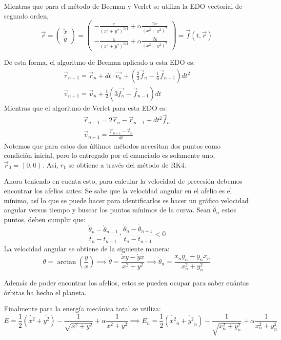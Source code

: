 \documentclass[letterpaper,oneside]{article}
\begin{document}
Mientras que para el método de Beeman y Verlet se utiliza la EDO vectorial de segundo orden,
$$\ddot\vec{r}=\begin{pmatrix}
\ddot{x}\\ 
\ddot{y}
\end{pmatrix}
=
\begin{pmatrix}
-\frac{x}{(x^2+y^2)^{3/2}}+\alpha\frac{2x}{(x^2+y^2)^2}\\ 
-\frac{y}{(x^2+y^2)^{3/2}}+\alpha\frac{2y}{(x^2+y^2)^2} 

\end{pmatrix}
=\vec{f}(t,\vec{r})      $$

De esta forma, el algoritmo de Beeman aplicado a esta EDO es:
$$\begin{matrix}
\vec{r}_{n+1}=\vec{r}_n+dt\cdot\vec{v_n}+(\frac{2}{3}\vec{f}_n-\frac{1}{6}\vec{f}_{n-1})dt^2\\ 
\vec{v}_{n+1}=\vec{v}_n+\frac{1}{2}(3\vec{f_n}-\vec{f}_{n-1})dt
\end{matrix} $$
Mientras que el algoritmo de Verlet para esta EDO es:
$$ 
\begin{matrix}
\vec{r}_{n+1}=2\vec{r}_n-\vec{r}_{n-1}+dt^2\vec{f}_n\\ 
\vec{v}_{n+1}=\frac{\vec{r}_{n+1}-\vec{r}_n}{dt}
\end{matrix}$$
Notemos que para estos dos últimos métodos necesitan dos puntos como condición inicial, pero lo entregado por el enunciado es solamente 
uno, $\vec{r}_0=(0,0)$. Así, $r_{1}$ se obtiene a través del método de RK4.

Ahora teniendo en cuenta esto, para calcular la velocidad de precesión debemos encontrar los afelios antes. Se sabe que la velocidad angular en el afelio es el mínimo, así lo que se puede hacer para identificarlos es hacer un gráfico velocidad angular versus tiempo y buscar los puntos mínimos de la curva. Sean $\dot{\theta}_n$ estos puntos, deben cumplir que:
$$ \frac{\dot{\theta}_n-\dot{\theta}_{n-1}}{t_n-t_{n-1}}\cdot \frac{\dot{\theta}_n-\dot{\theta}_{n+1}}{t_n-t_{n+1}} < 0$$
La velocidad angular se obtiene de la siguiente manera:
$$\theta=\arctan(\frac{y}{x})\implies \dot\theta=\frac{\dot{x}y-\dot{y}x}{x^2+y^2}\implies \dot\theta_n=\frac{\dot{x}_n y_n-\dot{y}_n x_n}{x_n^2+y_n^2}$$

Además de poder encontrar los afelios, estos se pueden ocupar para saber cuántas órbitas ha hecho el planeta.


Finalmente para la energía mecánica total se utiliza:
$$E= \frac{1}{2}(\dot{x^2}+\dot{y^2})-\frac{1}{\sqrt{x^2+y^2}}+\alpha \frac{1}{x^2+y^2}  \implies E_n =  \frac{1}{2}(\dot{x^2}_n+\dot{y^2}_n)-\frac{1}{\sqrt{x_n^2+y_n^2}}+\alpha \frac{1}{x_n^2+y_n^2}   $$
\end{document}
